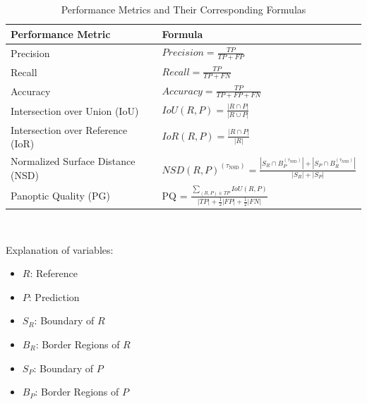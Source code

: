 \begin{table}[H]
	\centering
	\caption{Performance Metrics and Their Corresponding Formulas}
	\label{tabdefs}
	\renewcommand{\arraystretch}{2}
	\begin{tabular}{|l|l|}
		\hline
		\textbf{Performance Metric} & \textbf{Formula} \\
		\hline
		Precision & $Precision = \frac{TP}{TP + FP}$ \\
		\hline
		Recall & $Recall = \frac{TP}{TP + FN}$ \\
		\hline
		Accuracy & $Accuracy = \frac{TP}{TP + FP + FN}$ \\
		\hline
		
		Intersection over Union (IoU) & $IoU(R,P) = \frac{|R \cap P|}{|R \cup P|}$ \\
		\hline
		
		Intersection over Reference (IoR) & $IoR(R,P) = \frac{|R \cap P|}{|R|}$ \\
		\hline
		
		Normalized Surface Distance (NSD) & $NSD(R,P)^{(\tau_{\text{NSD}})} = \frac{|S_R \cap B_P^{(\tau_{\text{NSD}})}| + |S_P \cap B_R^{(\tau_{\text{NSD}})}|}{|S_R| + |S_P|}$
		\\
		\hline
		Panoptic Quality (PG) & PQ = $\frac{\sum_{(R, P) \in TP} IoU(R, P)}{|TP| + \frac{1}{2}|FP| + \frac{1}{2}|FN|}$ \\
		\hline
	\end{tabular}\\	
\end{table}
Explanation of variables:
\begin{itemize}[label={\tiny\raisebox{1ex}{\textbullet}}]
	\item $R$: Reference
	\item $P$: Prediction
	\item $S_R$: Boundary of $R$
	\item $B_R$: Border Regions of $R$
	\item $S_P$: Boundary of $P$
	\item $B_P$: Border Regions of $P$
\end{itemize}
